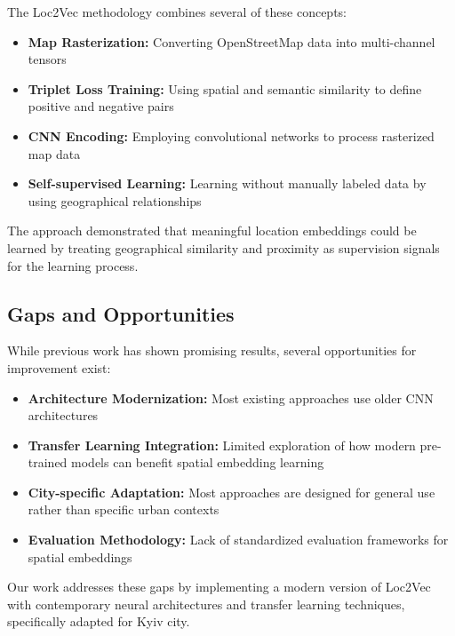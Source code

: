 The Loc2Vec methodology \cite{sentiance2018loc2vec} combines several of these concepts:

\begin{itemize}
    \item \textbf{Map Rasterization:} Converting OpenStreetMap data into multi-channel tensors
    \item \textbf{Triplet Loss Training:} Using spatial and semantic similarity to define positive and negative pairs
    \item \textbf{CNN Encoding:} Employing convolutional networks to process rasterized map data
    \item \textbf{Self-supervised Learning:} Learning without manually labeled data by using geographical relationships
\end{itemize}

The approach demonstrated that meaningful location embeddings could be learned by treating geographical similarity and proximity as supervision signals for the learning process.

\subsection{Gaps and Opportunities}

While previous work has shown promising results, several opportunities for improvement exist:

\begin{itemize}
    \item \textbf{Architecture Modernization:} Most existing approaches use older CNN architectures
    \item \textbf{Transfer Learning Integration:} Limited exploration of how modern pre-trained models can benefit spatial embedding learning
    \item \textbf{City-specific Adaptation:} Most approaches are designed for general use rather than specific urban contexts
    \item \textbf{Evaluation Methodology:} Lack of standardized evaluation frameworks for spatial embeddings
\end{itemize}

Our work addresses these gaps by implementing a modern version of Loc2Vec with contemporary neural architectures and transfer learning techniques, specifically adapted for Kyiv city.
